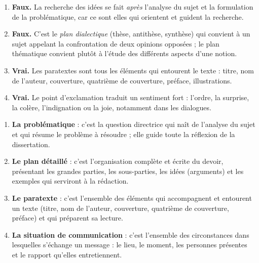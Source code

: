 \documentclass[11pt]{article}
\begin{document}
\begin{corrige}
\begin{enumerate}
\item \textbf{Faux.} La recherche des idées se fait \emph{après} l'analyse du sujet et la formulation de la problématique, car ce sont elles qui orientent et guident la recherche.
\item \textbf{Faux.} C'est le \emph{plan dialectique} (thèse, antithèse, synthèse) qui convient à un sujet appelant la confrontation de deux opinions opposées ; le plan thématique convient plutôt à l'étude des différents aspects d'une notion.
\item \textbf{Vrai.} Les paratextes sont tous les éléments qui entourent le texte : titre, nom de l'auteur, couverture, quatrième de couverture, préface, illustrations.
\item \textbf{Vrai.} Le point d'exclamation traduit un sentiment fort : l'ordre, la surprise, la colère, l'indignation ou la joie, notamment dans les dialogues.
\end{enumerate}
\end{corrige}

\begin{corrige}
\begin{enumerate}
\item \textbf{La problématique} : c'est la question directrice qui naît de l'analyse du sujet et qui résume le problème à résoudre ; elle guide toute la réflexion de la dissertation.
\item \textbf{Le plan détaillé} : c'est l'organisation complète et écrite du devoir, présentant les grandes parties, les sous-parties, les idées (arguments) et les exemples qui serviront à la rédaction.
\item \textbf{Le paratexte} : c'est l'ensemble des éléments qui accompagnent et entourent un texte (titre, nom de l'auteur, couverture, quatrième de couverture, préface) et qui préparent sa lecture.
\item \textbf{La situation de communication} : c'est l'ensemble des circonstances dans lesquelles s'échange un message : le lieu, le moment, les personnes présentes et le rapport qu'elles entretiennent.
\end{enumerate}
\end{corrige}
\end{document}
